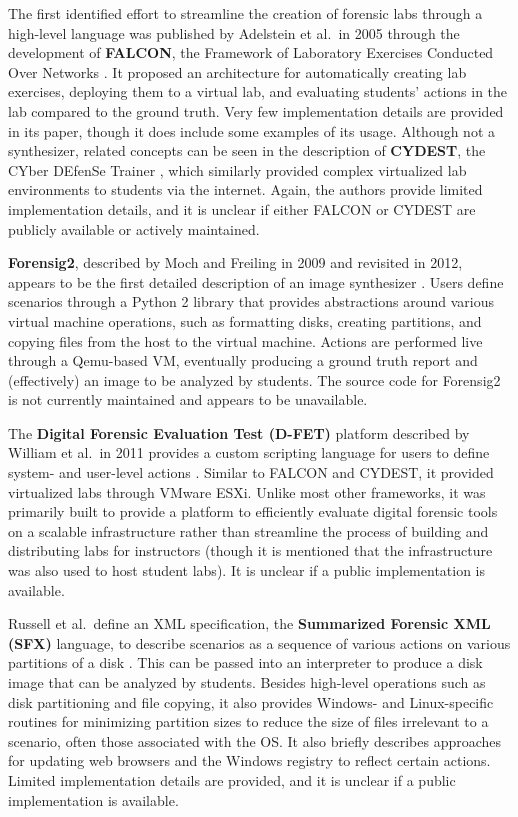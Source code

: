 \documentclass[letterpaper,12pt]{report}
\begin{document}
The first identified effort to streamline the creation of forensic labs
through a high-level language was published by Adelstein et al.~in 2005
through the development of \textbf{FALCON}, the Framework of Laboratory
Exercises Conducted Over Networks
\cite{adelsteinAutomaticallyCreatingRealistic2005}. It proposed an
architecture for automatically creating lab exercises, deploying them to
a virtual lab, and evaluating students' actions in the lab compared to
the ground truth. Very few implementation details are provided in its
paper, though it does include some examples of its usage. Although not a
synthesizer, related concepts can be seen in the description of
\textbf{CYDEST}, the CYber DEfenSe Trainer
\cite{bruecknerAutomatedComputerForensics2008}, which similarly
provided complex virtualized lab environments to students via the
internet. Again, the authors provide limited implementation details, and
it is unclear if either FALCON or CYDEST are publicly available or
actively maintained.

\textbf{Forensig2}, described by Moch and Freiling in 2009 and revisited
in 2012, appears to be the first detailed description of an image
synthesizer
\cite{mochForensicImageGenerator2009,mochEvaluatingForensicImage2012}.
Users define scenarios through a Python 2 library that provides
abstractions around various virtual machine operations, such as
formatting disks, creating partitions, and copying files from the host
to the virtual machine. Actions are performed live through a Qemu-based
VM, eventually producing a ground truth report and (effectively) an
image to be analyzed by students. The source code for Forensig2 is not
currently maintained and appears to be unavailable.

The \textbf{Digital Forensic Evaluation Test (D-FET)} platform described
by William et al.~in 2011 provides a custom scripting language for users
to define system- and user-level actions
\cite{williamCloudbasedDigitalForensics2011}. Similar to FALCON and
CYDEST, it provided virtualized labs through VMware ESXi. Unlike most
other frameworks, it was primarily built to provide a platform to
efficiently evaluate digital forensic tools on a scalable infrastructure
rather than streamline the process of building and distributing labs for
instructors (though it is mentioned that the infrastructure was also
used to host student labs). It is unclear if a public implementation is
available.

Russell et al.~define an XML specification, the \textbf{Summarized
Forensic XML (SFX)} language, to describe scenarios as a sequence of
various actions on various partitions of a disk
\cite{russellForensicImageDescription2012}. This can be passed into
an interpreter to produce a disk image that can be analyzed by students.
Besides high-level operations such as disk partitioning and file
copying, it also provides Windows- and Linux-specific routines for
minimizing partition sizes to reduce the size of files irrelevant to a
scenario, often those associated with the OS. It also briefly describes
approaches for updating web browsers and the Windows registry to reflect
certain actions. Limited implementation details are provided, and it is
unclear if a public implementation is available.
\end{document}

